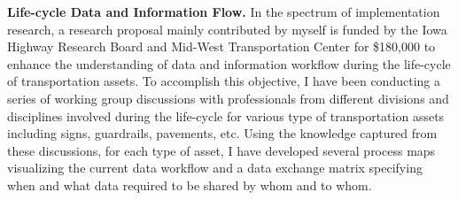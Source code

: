 \documentclass[a4paper,11pt]{article}
\begin{document}
%
%
\par
{\bf Life-cycle Data and Information Flow.} In the spectrum of implementation research, a research proposal mainly contributed by myself is funded by the Iowa Highway Research Board and Mid-West Transportation Center for \$180,000 to enhance the understanding of data and information workflow during the life-cycle of transportation assets.
%
To accomplish this objective, I have been conducting a series of working group discussions with professionals from different divisions and disciplines involved during the life-cycle for various type of transportation assets including signs, guardrails, pavements, etc.
%
Using the knowledge captured from these discussions, for each type of asset, I have developed several process maps visualizing the current data workflow and a data exchange matrix specifying when and what data required to be shared by whom and to whom.
%
%
%
\end{document}
